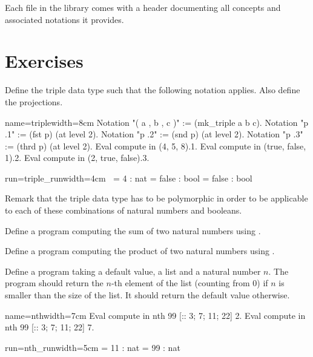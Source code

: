 Each file in the \mcbMC{} library comes with a header documenting
all concepts and associated notations it provides.


\newpage
\section{Exercises}

\begin{Exercise}[label=ex:triple,difficulty=0,title={The triple data type}]
Define the triple data type such that the following notation
applies.  Also define the projections.

\begin{coq}{name=triple}{width=8cm}
Notation "( a , b , c )" := (mk_triple a b c).
Notation "p .1" := (fst p) (at level 2).
Notation "p .2" := (snd p) (at level 2).
Notation "p .3" := (thrd p) (at level 2).
Eval compute in (4, 5, 8).1.
Eval compute in (true, false, 1).2.
Eval compute in (2, true, false).3.
\end{coq}
\begin{coqout}{run=triple_run}{width=4cm}
$~$
     = 4 : nat
     = false : bool
     = false : bool
\end{coqout}

Remark that the triple data type has to be polymorphic in order to
be applicable to each of these combinations of natural numbers and
booleans.
\end{Exercise}

\begin{Exercise}[label=ex:iteradd,difficulty=0,title={Addition with iteration}]
Define a program computing the sum of two natural numbers
using .
\end{Exercise}

\begin{Exercise}[label=ex:itermul,difficulty=0,title={Multiplication with iteration}]
Define a program computing the product of two natural numbers
using .
\end{Exercise}

\begin{Exercise}[label=ex:nth,difficulty=0,title={Find the n-th element}]
Define a program taking a default value, a list and  a natural number \(n\).
The program should return the \(n\)-th element of the list (counting
from \(0\)) if \(n\)
is smaller than the size of the list.  It should return
the default value otherwise.

\begin{coq}{name=nth}{width=7cm}
Eval compute in
  nth 99 [:: 3; 7; 11; 22] 2.
Eval compute in
  nth 99 [:: 3; 7; 11; 22] 7.
\end{coq}
\begin{coqout}{run=nth_run}{width=5cm}
     = 11
     : nat
     = 99
     : nat
\end{coqout}
\end{Exercise}


